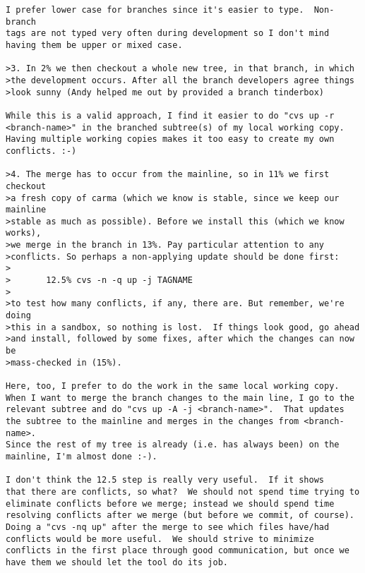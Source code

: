 \documentclass{article}
\begin{document}
\begin{enumerate}
\begin{verbatim}
I prefer lower case for branches since it's easier to type.  Non-branch
tags are not typed very often during development so I don't mind
having them be upper or mixed case.
                                                                                 
>3. In 2% we then checkout a whole new tree, in that branch, in which
>the development occurs. After all the branch developers agree things
>look sunny (Andy helped me out by provided a branch tinderbox)

While this is a valid approach, I find it easier to do "cvs up -r
<branch-name>" in the branched subtree(s) of my local working copy.
Having multiple working copies makes it too easy to create my own
conflicts. :-)
                                                                                
>4. The merge has to occur from the mainline, so in 11% we first checkout
>a fresh copy of carma (which we know is stable, since we keep our mainline
>stable as much as possible). Before we install this (which we know works),
>we merge in the branch in 13%. Pay particular attention to any 
>conflicts. So perhaps a non-applying update should be done first:
>
>       12.5% cvs -n -q up -j TAGNAME
>
>to test how many conflicts, if any, there are. But remember, we're doing
>this in a sandbox, so nothing is lost.  If things look good, go ahead
>and install, followed by some fixes, after which the changes can now be
>mass-checked in (15%).

Here, too, I prefer to do the work in the same local working copy.
When I want to merge the branch changes to the main line, I go to the
relevant subtree and do "cvs up -A -j <branch-name>".  That updates
the subtree to the mainline and merges in the changes from <branch-name>.
Since the rest of my tree is already (i.e. has always been) on the
mainline, I'm almost done :-).
                                                                                
I don't think the 12.5 step is really very useful.  If it shows
that there are conflicts, so what?  We should not spend time trying to
eliminate conflicts before we merge; instead we should spend time
resolving conflicts after we merge (but before we commit, of course).
Doing a "cvs -nq up" after the merge to see which files have/had
conflicts would be more useful.  We should strive to minimize
conflicts in the first place through good communication, but once we
have them we should let the tool do its job.


\end{verbatim}
\end{enumerate}
\end{document}
